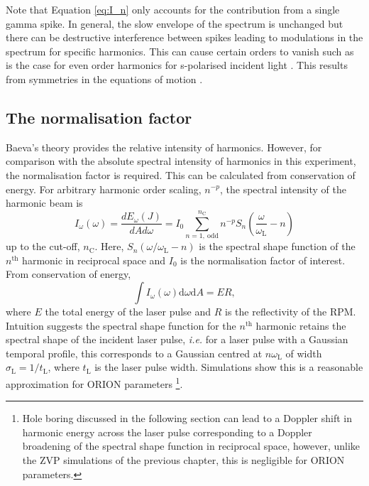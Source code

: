 Note that Equation \ref{eq:I_n} only accounts for the contribution from a single gamma spike. In general, the slow envelope of the spectrum is unchanged \cite{baevaHighHarmonicGeneration2008} but there can be destructive interference between spikes leading to modulations in the spectrum for specific harmonics. This can cause certain orders to vanish such as is the case for even order harmonics for s-polarised incident light \cite{lichtersShortpulseLaserHarmonics1996}. This results from symmetries in the equations of motion \cite{trinesLaserHarmonicGeneration2023}.


\subsection{The normalisation factor}
Baeva's theory provides the relative intensity of harmonics. However, for comparison with the absolute spectral intensity of harmonics in this experiment, the normalisation factor is required. This can be calculated from conservation of energy. For arbitrary harmonic order scaling, $n^{-p}$, the spectral intensity of the harmonic beam is
\begin{equation}
	I_\omega(\omega) = \frac{dE_\omega(J)}{dAd\omega} = I_0 \sum^{n_\mathrm{C}}_{n = 1,\ \mathrm{odd}} n^{-p} S_n\left( \frac{\omega}{\omega_\mathrm{L}}-n\right)
\end{equation}
up to the cut-off, $n_\mathrm{C}$. Here, $S_n(\omega/\omega_\mathrm{L}-n)$ is the spectral shape function of the $n^\mathrm{th}$ harmonic in reciprocal space and $I_0$ is the normalisation factor of interest. From conservation of energy,
\begin{equation}
	\int I_\omega(\omega) \mathrm{d}\omega \mathrm{d} A = ER,
\end{equation}
where $E$ the total energy of the laser pulse and $R$ is the reflectivity of the \ac{RPM}. Intuition suggests the spectral shape function for the $n^\mathrm{th}$ harmonic retains the spectral shape of the incident laser pulse, \textit{i.e.} for a laser pulse with a Gaussian temporal profile, this corresponds to a Gaussian centred at $n\omega_\mathrm{L}$ of width $\sigma_\mathrm{L} = 1/t_\mathrm{L}$, where $t_\mathrm{L}$ is the laser pulse width. Simulations show this is a reasonable approximation for ORION parameters \footnote{Hole boring discussed in the following section can lead to a Doppler shift in harmonic energy across the laser pulse corresponding to a Doppler broadening of the spectral shape function in reciprocal space, however, unlike the ZVP simulations of the previous chapter, this is negligible for ORION parameters.}.

